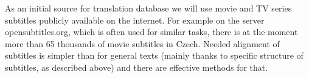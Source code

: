 
As an initial source for translation database we will use movie and TV series subtitles publicly available on the internet. For example on the server opensubtitles.org, which is often used for similar tasks, there is at the moment more than 65 thousands of movie subtitles in Czech. Needed alignment of subtitles is simpler than for general texts (mainly thanks to specific structure of subtitles, as described above) and there are effective methods for that.


